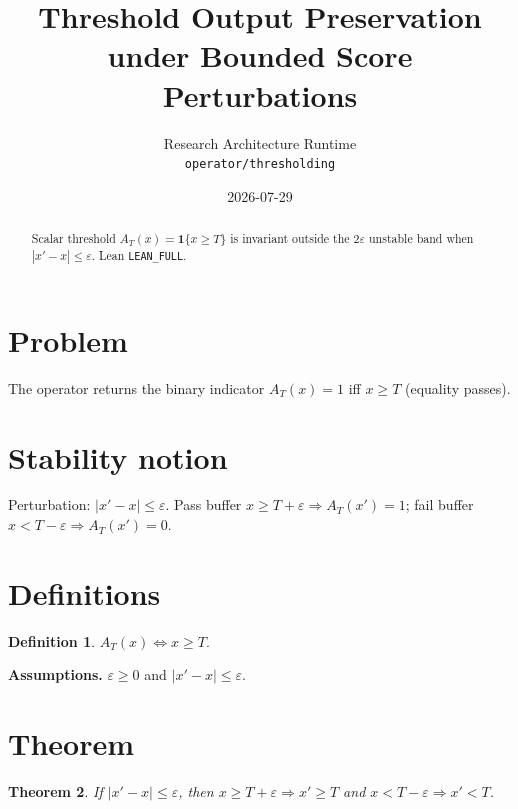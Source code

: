\documentclass[12pt]{article}
\title{Threshold Output Preservation under Bounded Score Perturbations}
\author{Research Architecture Runtime\\[0.25em]
{\normalsize\texttt{operator/thresholding}}}
\date{2026-07-29}
\theoremstyle{plain}
\newtheorem{theorem}{Theorem}
\theoremstyle{definition}
\newtheorem{definition}[theorem]{Definition}
\theoremstyle{remark}
\begin{document}
\maketitle

\begin{abstract}
Scalar threshold $A_T(x)=\mathbf{1}\{x\ge T\}$ is invariant outside the $2\varepsilon$ unstable band when $|x'-x|\le\varepsilon$. Lean \texttt{LEAN\_FULL}.
\end{abstract}

\noindent
\begin{center}
\end{center}
\vspace{0.6em}

\section{Problem}
{\raggedright\sloppy
The operator returns the binary indicator $A_T(x)=1$ iff $x\ge T$ (equality passes).
\par}

\section{Stability notion}
Perturbation: $|x'-x|\le\varepsilon$. Pass buffer $x\ge T+\varepsilon\Rightarrow A_T(x')=1$; fail buffer $x<T-\varepsilon\Rightarrow A_T(x')=0$.

\section{Definitions}
\begin{definition}
$A_T(x)\Leftrightarrow x\ge T$.\end{definition}
\noindent\textbf{Assumptions.} $\varepsilon\ge 0$ and $|x'-x|\le\varepsilon$.

\section{Theorem}
\begin{theorem}\label{thm:inv}
If $|x'-x|\le\varepsilon$, then $x\ge T+\varepsilon\Rightarrow x'\ge T$ and $x<T-\varepsilon\Rightarrow x'<T$.
\end{theorem}
\end{document}

